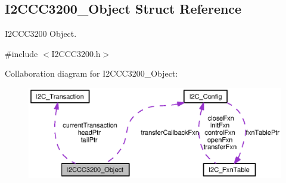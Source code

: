 \subsection{I2\-C\-C\-C3200\-\_\-\-Object Struct Reference}
\label{struct_i2_c_c_c3200___object}


I2\-C\-C\-C3200 Object.  




{\ttfamily \#include $<$I2\-C\-C\-C3200.\-h$>$}



Collaboration diagram for I2\-C\-C\-C3200\-\_\-\-Object\-:
\nopagebreak
\begin{figure}[H]
\begin{center}
\leavevmode
\includegraphics[width=350pt]{struct_i2_c_c_c3200___object__coll__graph}
\end{center}
\end{figure}
